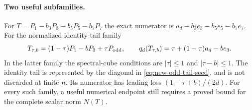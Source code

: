 \paragraph{Two useful subfamilies.}
For $T=P_1-b_3P_3-b_5P_5-b_7P_7$ the exact numerator is
$a_d-b_3e_3-b_5e_5-b_7e_7$.  For the normalized identity-tail family
\[
 T_{\tau,b}=(1-\tau)P_1-bP_3+\tau P_{\rm odd},
 \qquad q_d(T_{\tau,b})=\tau+(1-\tau)a_d-be_3.
\]
In the latter family the spectral-cube conditions are
$|\tau|\leq1$ and $|\tau-b|\leq1$.  The identity tail is represented
by the diagonal in \eqref{eq:new-odd-tail-seed}, and is not discarded
at finite $n$.  Its numerator has leading loss
$(1-\tau+b)/(2d)$.  For every such family, a useful numerical endpoint
still requires a proved bound for the complete scalar norm $N(T)$.
